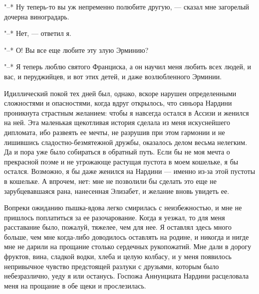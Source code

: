 "--* Ну  теперь-то вы  уж непременно полюбите  другую, ---  сказал мне
загорелый дочерна виноградарь.

"--* Нет, --- ответил я.

"--* О! Вы все еще любите эту злую Эрминию?

"--* Я  теперь люблю святого Франциска,  а он научил меня  любить всех
людей, и  вас, и перуджийцев, и  вот этих детей, и  даже возлюбленного
Эрминии.

Идиллический покой тех дней  был, однако, вскоре нарушен определенными
сложностями и опасностями, когда  вдруг открылось, что синьора Нардини
проникнута страстным  желанием: чтобы  я навсегда  остался в  Ассизи и
женился  на ней.  Эта  маленькая щекотливая  история  сделала из  меня
искуснейшего дипломата,  ибо развеять ее  мечты, не разрушив  при этом
гармонии и не лишившись  сладостно-безмятежной дружбы, оказалось делом
весьма нелегким. Да  и пора уже было собираться в  обратный путь. Если
бы не моя  мечта о прекрасной поэме и не  угрожающе растущая пустота в
моем кошельке,  я бы остался. Возможно,  я бы даже женился  на Нардини
---  именно из-за  этой пустоты  в кошельке.  А впрочем,  нет: мне  не
позволили  бы  сделать это  еще  не  зарубцевавшаяся рана,  нанесенная
Элизабет, и желание вновь увидеть ее.

Вопреки ожиданию пышка-вдова легко смирилась с неизбежностью, и мне не
пришлось поплатиться за ее разочарование.  Когда я уезжал, то для меня
расставание  было, пожалуй,  тяжелее, чем  для нее.  Я оставлял  здесь
много  больше,  чем мне  когда-либо  доводилось  оставлять на  родине,
и  никогда  и  нигде  мне  не дарили  на  прощание  столько  сердечных
рукопожатий. Мне дали  в дорогу фруктов, вина, сладкой  водки, хлеба и
целую  колбасу, и  у  меня появилось  непривычное чувство  предстоящей
разлуки с друзьями,  которым было небезразлично, уеду  я или останусь.
Госпожа Аннунциата Нардини  расцеловала меня на прощание в  обе щеки и
прослезилась.

